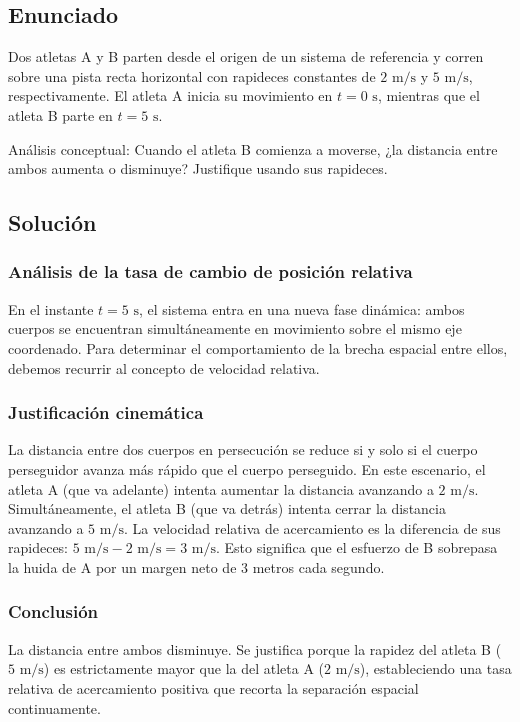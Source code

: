 \documentclass[12pt, a4paper]{article}
\begin{document}
\newpage
\subsection*{Enunciado}
 Dos atletas A y B parten desde el origen de un sistema de referencia y corren sobre una pista recta horizontal con rapideces constantes de $2\text{ m/s}$ y $5\text{ m/s}$, respectivamente. El atleta A inicia su movimiento en $t = 0\text{ s}$, mientras que el atleta B parte en $t = 5\text{ s}$.

Análisis conceptual: Cuando el atleta B comienza a moverse, ¿la distancia entre ambos aumenta o disminuye? Justifique usando sus rapideces.

\subsection*{Solución}

\subsubsection*{Análisis de la tasa de cambio de posición relativa}
En el instante $t=5\text{ s}$, el sistema entra en una nueva fase dinámica: ambos cuerpos se encuentran simultáneamente en movimiento sobre el mismo eje coordenado. Para determinar el comportamiento de la brecha espacial entre ellos, debemos recurrir al concepto de velocidad relativa.

\subsubsection*{Justificación cinemática}
La distancia entre dos cuerpos en persecución se reduce si y solo si el cuerpo perseguidor avanza más rápido que el cuerpo perseguido. En este escenario, el atleta A (que va adelante) intenta aumentar la distancia avanzando a $2\text{ m/s}$. Simultáneamente, el atleta B (que va detrás) intenta cerrar la distancia avanzando a $5\text{ m/s}$. La velocidad relativa de acercamiento es la diferencia de sus rapideces: $5\text{ m/s} - 2\text{ m/s} = 3\text{ m/s}$. Esto significa que el esfuerzo de B sobrepasa la huida de A por un margen neto de $3$ metros cada segundo.

\subsubsection*{Conclusión}
La distancia entre ambos disminuye. Se justifica porque la rapidez del atleta B ($5\text{ m/s}$) es estrictamente mayor que la del atleta A ($2\text{ m/s}$), estableciendo una tasa relativa de acercamiento positiva que recorta la separación espacial continuamente.
\end{document}
